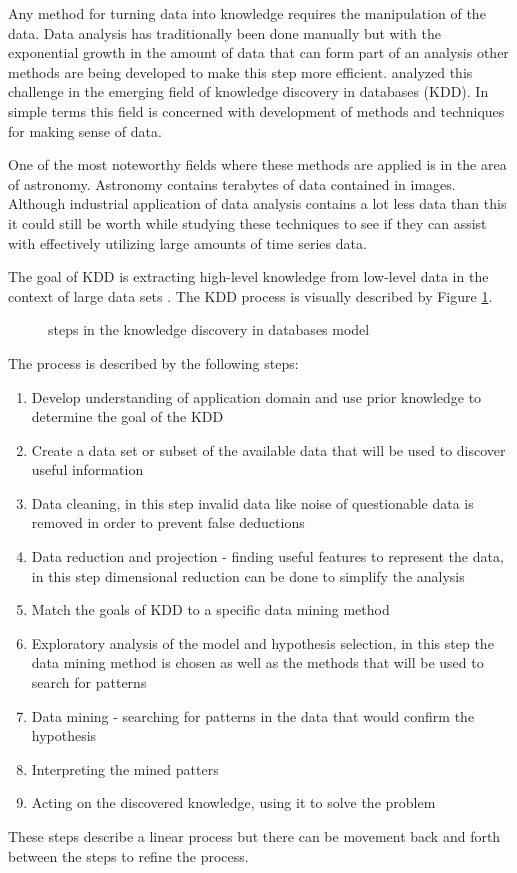 Any method for turning data into knowledge requires the manipulation of the data. Data analysis has traditionally been done manually but with the exponential growth in the amount of data that can form part of an analysis other methods are being developed to make this step more efficient. \cite{fayyad1996data} analyzed this challenge in the emerging field of knowledge discovery in databases (KDD). In simple terms this field is concerned with development of methods and techniques for making sense of data.


One of the most noteworthy fields where these methods are applied is in the area of astronomy. Astronomy contains terabytes of data contained in images. Although industrial application of data analysis contains a lot less data than this it could still be worth while studying these techniques to see if they can assist with effectively utilizing large amounts of time series data.

The goal of KDD is extracting high-level knowledge from low-level data in the context of large data sets \cite{fayyad1996data}. The KDD process is visually described by Figure \ref{fig:6}.
\begin{figure}[!ht]
	\centering{}
	\caption{\cite{fayyad1996data} steps in the knowledge discovery in databases model}\label{fig:6}
\end{figure}
The process is described by the following steps:
\begin{enumerate}
	\item Develop understanding of application domain and use prior knowledge to determine the goal of the KDD
	\item Create a data set or subset of the available data that will be used to discover useful information
	\item Data cleaning, in this step invalid data like noise of questionable data is removed in order to prevent false deductions
	\item Data reduction and projection - finding useful features to represent the data, in this step dimensional reduction can be done to simplify the analysis
	\item Match the goals of KDD to a specific data mining method
	\item Exploratory analysis of the model and hypothesis selection, in this step the data mining method is chosen as  well as the methods that will be used to search for patterns
	\item Data mining - searching for patterns in the data that would confirm the hypothesis
	\item Interpreting the mined patters
	\item Acting on the discovered knowledge, using it to solve the problem
\end{enumerate}
These steps describe a linear process but there can be movement back and forth between the steps to refine the process.


